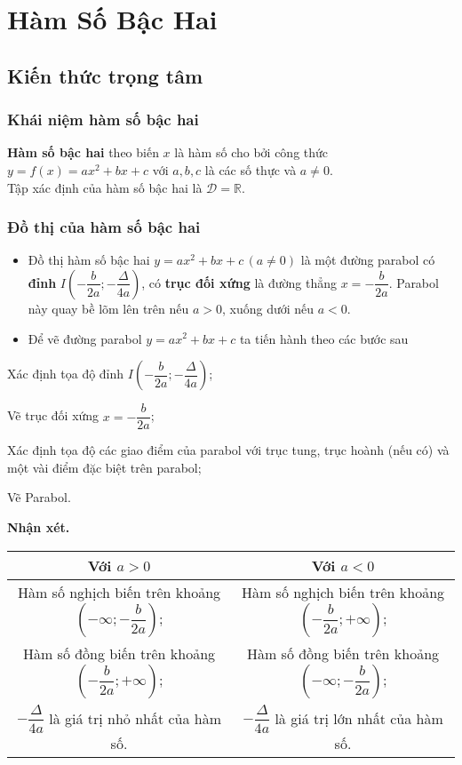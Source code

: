 \setcounter{section}{1}
\section{Hàm Số Bậc Hai}
\subsection{Kiến thức trọng tâm}
\subsubsection{Khái niệm hàm số bậc hai}
\begin{tcolorbox}
\textbf{Hàm số bậc hai} theo biến $x$ là hàm số cho bởi công thức $y=f(x)=ax^2+bx+c$ với $a,b,c$ là các số thực và $a\neq 0$.\\
Tập xác định của hàm số bậc hai là $\mathscr{D}= \mathbb{R}$.
\end{tcolorbox}
\subsubsection{Đồ thị của hàm số bậc hai}
\begin{tcolorbox}
\begin{itemize}
	\item Đồ thị hàm số bậc hai $y=ax^2+bx+c\,(a\ne 0)$ là một đường parabol có \textbf{đỉnh} $I\left(-\dfrac{b}{2a};-\dfrac{\Delta}{4a}\right)$, có \textbf{trục đối xứng} là đường thẳng $x=-\dfrac{b}{2a}$. Parabol này quay bề lõm lên trên nếu $a>0$, xuống dưới nếu $a<0$.
	\item Để vẽ đường parabol $y=ax^2+bx+c$ ta tiến hành theo các bước sau
\end{itemize}
\begin{enumEX}{1}
\item Xác định tọa độ đỉnh $I\left(-\dfrac{b}{2a};-\dfrac{\Delta}{4a}\right)$;
\item Vẽ trục đối xứng $x=-\dfrac{b}{2a}$;
\item Xác định tọa độ các giao điểm của parabol với trục tung, trục hoành (nếu có) và một vài điểm đặc biệt trên parabol; 
\item Vẽ Parabol.
\end{enumEX}
\end{tcolorbox}
\textbf{Nhận xét.}
\begin{center}
\begin{tabular}{|c|c|}
\hline
Với $a>0$& Với $a<0$\\
\hline
Hàm số nghịch biến trên khoảng $\left(-\infty;-\dfrac{b}{2a}\right)$;&Hàm số nghịch biến trên khoảng $\left(-\dfrac{b}{2a};+\infty\right)$;\\
Hàm số đồng biến trên khoảng $\left(-\dfrac{b}{2a};+\infty\right)$;&Hàm số đồng biến trên khoảng $\left(-\infty;-\dfrac{b}{2a}\right)$;\\ $-\dfrac{\Delta}{4a}$ là giá trị nhỏ nhất của hàm số.&$-\dfrac{\Delta}{4a}$ là giá trị lớn nhất của hàm số.\\
\hline	
\end{tabular}
\end{center}
